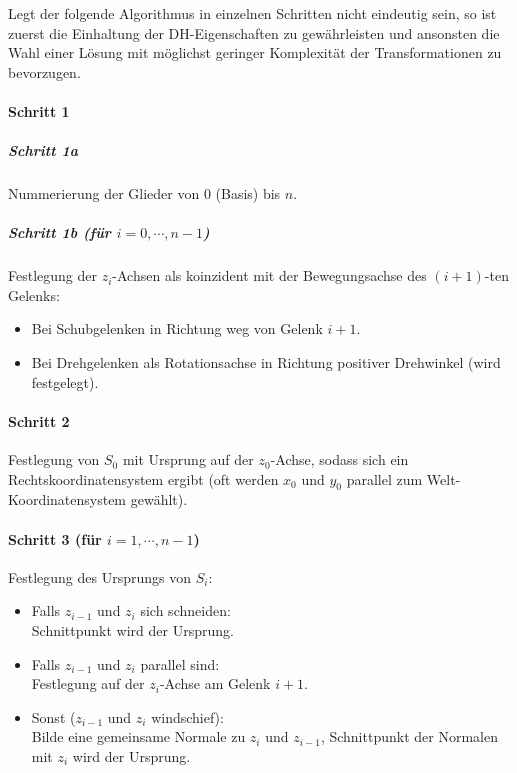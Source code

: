 \documentclass[a4paper, 11pt, accentcolor = tud3b]{tudreport}
\begin{document}
					Legt der folgende Algorithmus in einzelnen Schritten nicht eindeutig sein, so ist zuerst die Einhaltung der DH-Eigenschaften zu gewährleisten und ansonsten die Wahl einer Lösung mit möglichst geringer Komplexität der Transformationen zu bevorzugen.
					
					\paragraph{Schritt 1}
						\subparagraph{Schritt 1a}
						Nummerierung der Glieder von \(0\) (Basis) bis \(n\).
						
						\subparagraph{Schritt 1b (für \( i = 0, \cdots, n - 1 \))}
						Festlegung der \(z_i\)-Achsen als koinzident mit der Bewegungsachse des \( (i + 1) \)-ten Gelenks:
						\begin{itemize}
							\item Bei Schubgelenken in Richtung weg von Gelenk \(i + 1\).
							\item Bei Drehgelenken als Rotationsachse in Richtung positiver Drehwinkel (wird festgelegt).
						\end{itemize}
					
					\paragraph{Schritt 2}
						Festlegung von \(S_0\) mit Ursprung auf der \(z_0\)-Achse, sodass sich ein Rechtskoordinatensystem ergibt (oft werden \(x_0\) und \(y_0\) parallel zum Welt-Koordinatensystem gewählt).
					
					\paragraph{Schritt 3 (für \( i = 1, \cdots, n - 1 \))}
						Festlegung des Ursprungs von \(S_i\):
						\begin{itemize}
							\item Falls \(z_{i - 1}\) und \(z_i\) sich schneiden: \\ Schnittpunkt wird der Ursprung.
							\item Falls \(z_{i - 1}\) und \(z_i\) parallel sind: \\ Festlegung auf der \(z_i\)-Achse am Gelenk \(i + 1\).
							\item Sonst (\(z_{i - 1}\) und \(z_i\) windschief): \\ Bilde eine gemeinsame Normale zu \(z_i\) und \(z_{i - 1}\), Schnittpunkt der Normalen mit \(z_i\) wird der Ursprung.
						\end{itemize}
					
\end{document}

